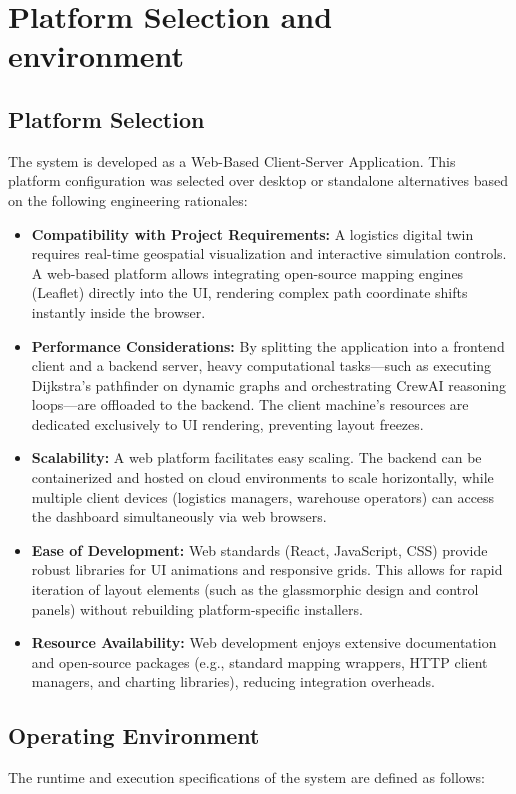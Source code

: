 \section[Platform Selection and environment]{Platform Selection and environment}
\subsection[Platform Selection]{Platform Selection}
The system is developed as a Web-Based Client-Server Application. This platform configuration was selected over desktop or standalone alternatives based on the following engineering rationales:

\begin{itemize}
    \item \textbf{Compatibility with Project Requirements:} A logistics digital twin requires real-time geospatial visualization and interactive simulation controls. A web-based platform allows integrating open-source mapping engines (Leaflet) directly into the UI, rendering complex path coordinate shifts instantly inside the browser.
    \item \textbf{Performance Considerations:} By splitting the application into a frontend client and a backend server, heavy computational tasks—such as executing Dijkstra’s pathfinder on dynamic graphs and orchestrating CrewAI reasoning loops—are offloaded to the backend. The client machine's resources are dedicated exclusively to UI rendering, preventing layout freezes.
    \item \textbf{Scalability:} A web platform facilitates easy scaling. The backend can be containerized and hosted on cloud environments to scale horizontally, while multiple client devices (logistics managers, warehouse operators) can access the dashboard simultaneously via web browsers.
    \item \textbf{Ease of Development:} Web standards (React, JavaScript, CSS) provide robust libraries for UI animations and responsive grids. This allows for rapid iteration of layout elements (such as the glassmorphic design and control panels) without rebuilding platform-specific installers.
    \item \textbf{Resource Availability:} Web development enjoys extensive documentation and open-source packages (e.g., standard mapping wrappers, HTTP client managers, and charting libraries), reducing integration overheads.
\end{itemize}

\subsection[Operating Environment]{Operating Environment}
The runtime and execution specifications of the system are defined as follows:

